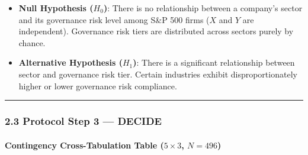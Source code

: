 \documentclass[
]{article}
\providecommand{\tightlist}{%
  \setlength{\itemsep}{0pt}\setlength{\parskip}{0pt}}
\begin{document}
\begin{itemize}
\tightlist
\item
  \textbf{Null Hypothesis (\(H_0\))}: There is no relationship between a
  company's sector and its governance risk level among S\&P 500 firms
  (\(X\) and \(Y\) are independent). Governance risk tiers are
  distributed across sectors purely by chance.
\item
  \textbf{Alternative Hypothesis (\(H_1\))}: There is a significant
  relationship between sector and governance risk tier. Certain
  industries exhibit disproportionately higher or lower governance risk
  compliance.
\end{itemize}

\begin{center}\rule{0.5\linewidth}{0.5pt}\end{center}

\subsubsection{2.3 Protocol Step 3 ---
DECIDE}\label{protocol-step-3-decide}

\paragraph{\texorpdfstring{Contingency Cross-Tabulation Table
(\(5 \times 3\),
\(N = 496\))}{Contingency Cross-Tabulation Table (5 \textbackslash times 3, N = 496)}}\label{contingency-cross-tabulation-table-5-times-3-n-496}
\end{document}
